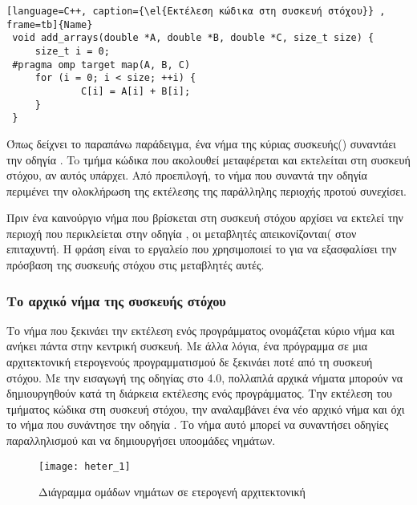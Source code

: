 \begin{spacing}{1.4}
\begin{lstlisting}[language=C++, caption={\el{Εκτέλεση κώδικα στη συσκευή στόχου}} , frame=tb]{Name}
 void add_arrays(double *A, double *B, double *C, size_t size) {
     size_t i = 0;
 #pragma omp target map(A, B, C)
     for (i = 0; i < size; ++i) {
             C[i] = A[i] + B[i];
     }
 }
\end{lstlisting}
\end{spacing}

Όπως δείχνει το παραπάνω παράδειγμα, ένα νήμα της κύριας συσκευής(\emph{}) συναντάει την οδηγία
\emph{}. To τμήμα κώδικα που ακολουθεί μεταφέρεται και εκτελείται στη συσκευή στόχου, αν
αυτός υπάρχει. Από προεπιλογή, το νήμα που συναντά την οδηγία περιμένει την ολοκλήρωση της εκτέλεσης της παράλληλης
περιοχής προτού συνεχίσει.

Πριν ένα καινούργιο νήμα που βρίσκεται στη συσκευή στόχου αρχίσει να εκτελεί την περιοχή που περικλείεται στην οδηγία
\emph{}, οι μεταβλητές \emph{} απεικονίζονται(\emph{} στον επιταχυντή. Η φράση
\emph{} είναι το εργαλείο που χρησιμοποιεί το \emph{} για να εξασφαλίσει την πρόσβαση της
συσκευής στόχου στις μεταβλητές αυτές.


\subsubsection{Το αρχικό νήμα της συσκευής στόχου}
Το νήμα που ξεκινάει την εκτέλεση ενός προγράμματος ονομάζεται κύριο νήμα και ανήκει πάντα στην κεντρική συσκευή. Με
άλλα λόγια, ένα πρόγραμμα σε μια αρχιτεκτονική ετερογενούς προγραμματισμού δε ξεκινάει ποτέ από τη συσκευή στόχου.
\clearpage
Με την εισαγωγή της οδηγίας \textbf{} στο \emph{} 4.0, πολλαπλά αρχικά νήματα μπορούν να
δημιουργηθούν κατά τη διάρκεια εκτέλεσης ενός προγράμματος. Την εκτέλεση του τμήματος κώδικα στη συσκευή στόχου, την
αναλαμβάνει ένα νέο αρχικό νήμα και όχι το νήμα που συνάντησε την οδηγία \emph{}. Το νήμα αυτό μπορεί να
συναντήσει οδηγίες παραλληλισμού και να δημιουργήσει υποομάδες νημάτων. \ \\
\begin{figure}[h]
\texttt{[image: heter\_1]}
\centering
\captionsetup{justification=centering, singlelinecheck=false}
	\caption{Διάγραμμα ομάδων νημάτων σε ετερογενή αρχιτεκτονική}
\label{fig:heter_1}
\end{figure}


